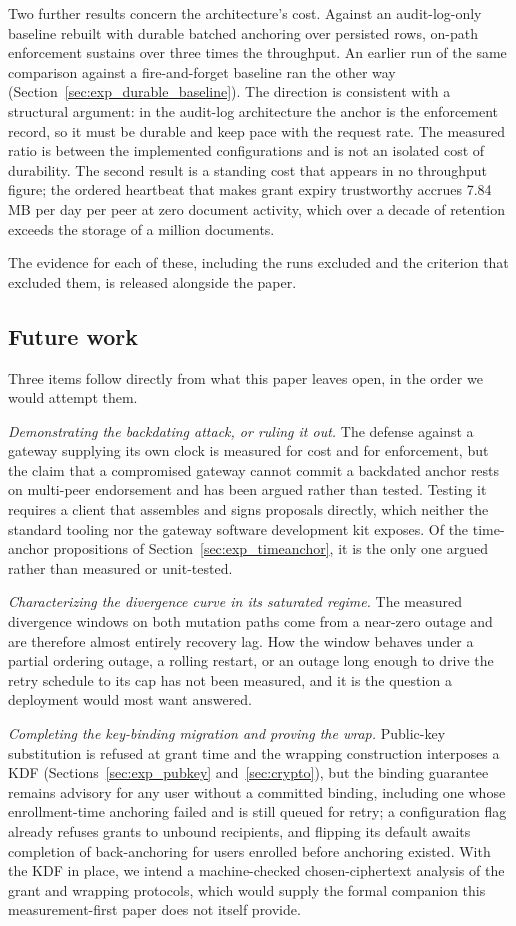 \documentclass[preprint,12pt]{elsarticle}
\begin{document}
Two further results concern the architecture's cost. Against an
audit-log-only baseline rebuilt with durable batched anchoring over persisted
rows, on-path enforcement sustains over three times the throughput. An
earlier run of the same comparison against a fire-and-forget baseline ran the
other way (Section~\ref{sec:exp_durable_baseline}). The direction
is consistent with a structural argument: in the audit-log architecture the
anchor is the enforcement record, so it must be durable and keep pace with the
request rate. The measured ratio is between the implemented configurations and
is not an isolated cost of durability. The second result is a standing cost
that appears in no throughput figure; the ordered heartbeat that makes grant expiry trustworthy
accrues 7.84\,MB per day per peer at zero document activity, which over a
decade of retention exceeds the storage of a million documents.

The evidence for each of these, including the runs excluded and the criterion
that excluded them, is released alongside the paper.

\subsection*{Future work}

Three items follow directly from what this paper leaves open, in the order we
would attempt them.

\emph{Demonstrating the backdating attack, or ruling it out.} The defense
against a gateway supplying its own clock is measured for cost and for
enforcement, but the claim that a compromised gateway cannot commit a
backdated anchor rests on multi-peer endorsement and has been argued rather
than tested. Testing it requires a client that assembles and signs proposals
directly, which neither the standard tooling nor the gateway software
development kit exposes. Of the time-anchor propositions of
Section~\ref{sec:exp_timeanchor}, it is the only one argued rather than
measured or unit-tested.

\emph{Characterizing the divergence curve in its saturated regime.} The measured
divergence windows on both mutation paths come from a near-zero outage and
are therefore almost entirely recovery lag. How the window behaves under a
partial ordering outage, a rolling restart, or an outage long enough to drive
the retry schedule to its cap has not been measured, and it is the question a
deployment would most want answered.

\emph{Completing the key-binding migration and proving the wrap.}
Public-key substitution is refused at grant time and the wrapping
construction interposes a KDF (Sections~\ref{sec:exp_pubkey}
and~\ref{sec:crypto}), but the binding guarantee remains advisory for any user without a
committed binding, including one whose enrollment-time anchoring failed and is
still queued for retry; a configuration flag already refuses grants to unbound
recipients, and flipping its default awaits completion of back-anchoring for
users enrolled before anchoring existed. With the KDF in place, we
intend a machine-checked chosen-ciphertext analysis of the grant and wrapping
protocols, which would supply the formal companion this measurement-first
paper does not itself provide.
\end{document}
